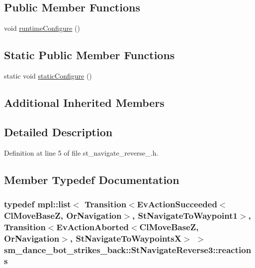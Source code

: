 \subsection*{Public Member Functions}
\begin{DoxyCompactItemize}
\item 
void \hyperlink{structsm__dance__bot__strikes__back_1_1StNavigateReverse3_a2b8eef6f3186b5bddef66e944be5f68a}{runtime\+Configure} ()
\end{DoxyCompactItemize}
\subsection*{Static Public Member Functions}
\begin{DoxyCompactItemize}
\item 
static void \hyperlink{structsm__dance__bot__strikes__back_1_1StNavigateReverse3_a4670afe58480a98550b4139930b95e41}{static\+Configure} ()
\end{DoxyCompactItemize}
\subsection*{Additional Inherited Members}


\subsection{Detailed Description}


Definition at line 5 of file st\+\_\+navigate\+\_\+reverse\+\_.\+h.



\subsection{Member Typedef Documentation}
\subsubsection[{\texorpdfstring{reactions}{reactions}}]{\setlength{\rightskip}{0pt plus 5cm}typedef mpl\+::list$<$ Transition$<$Ev\+Action\+Succeeded$<${\bf Cl\+Move\+BaseZ}, {\bf Or\+Navigation}$>$, {\bf St\+Navigate\+To\+Waypoint1}$>$, Transition$<$Ev\+Action\+Aborted$<${\bf Cl\+Move\+BaseZ}, {\bf Or\+Navigation}$>$, {\bf St\+Navigate\+To\+WaypointsX}$>$ $>$ {\bf sm\+\_\+dance\+\_\+bot\+\_\+strikes\+\_\+back\+::\+St\+Navigate\+Reverse3\+::reactions}}\hypertarget{structsm__dance__bot__strikes__back_1_1StNavigateReverse3_a5c1180a82dc742066f74de9218d14b4e}{}\label{structsm__dance__bot__strikes__back_1_1StNavigateReverse3_a5c1180a82dc742066f74de9218d14b4e}


